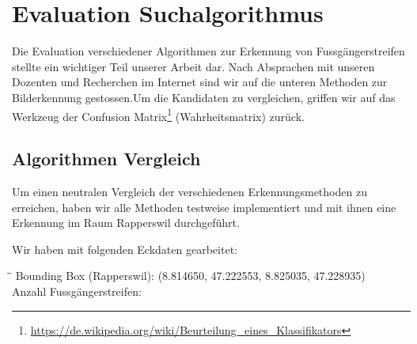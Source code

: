 \section{Evaluation Suchalgorithmus}
\label{sec:suchalgorithmus}
Die Evaluation verschiedener Algorithmen zur Erkennung von Fussgängerstreifen stellte ein wichtiger Teil unserer Arbeit dar. Nach Absprachen mit unseren Dozenten und Recherchen im Internet sind wir auf die unteren Methoden zur Bilderkennung gestossen.Um die Kandidaten zu vergleichen, griffen wir auf das Werkzeug der Confusion Matrix\footnote{\url{https://de.wikipedia.org/wiki/Beurteilung_eines_Klassifikators}} (Wahrheitsmatrix) zurück.

\subsection{Algorithmen Vergleich}
Um einen neutralen Vergleich der verschiedenen Erkennungsmethoden zu erreichen, haben wir alle Methoden testweise implementiert und mit ihnen eine Erkennung im Raum Rapperswil durchgeführt.

Wir haben mit folgenden Eckdaten gearbeitet:
\begin{tabbing}[H]
    \hspace*{5cm}\=\hspace*{6cm}\= \kill
    Bounding Box (Rapperswil): \> (8.814650, 47.222553, 8.825035, 47.228935) \\
    Anzahl Fussgängerstreifen:  \\
\end{tabbing}


